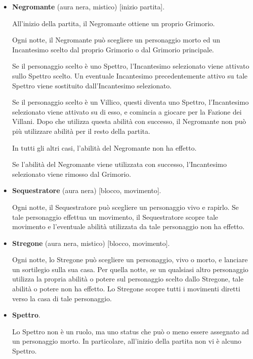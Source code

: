 \documentclass[a4paper,10pt]{article}
\begin{document}
\begin{itemize}
    \item {\bf Negromante} (aura nera, mistico) [inizio partita].

          All'inizio della partita, il Negromante ottiene un proprio Grimorio.

          Ogni notte, il Negromante può scegliere un personaggio morto ed un Incantesimo scelto dal proprio Grimorio o dal Grimorio principale.

          Se il personaggio scelto è uno Spettro, l'Incantesimo selezionato viene attivato sullo Spettro scelto. Un eventuale Incantesimo precedentemente attivo su tale Spettro viene sostituito dall'Incantesimo selezionato. %

          Se il personaggio scelto è un Villico, questi diventa uno Spettro, l'Incantesimo selezionato viene attivato su di esso, e comincia a giocare per la Fazione dei Villani. Dopo che utilizza questa abilità con successo, il Negromante non può più utilizzare abilità per il resto della partita.

          In tutti gli altri casi, l'abilità del Negromante non ha effetto.

          Se l'abilità del Negromante viene utilizzata con successo, l'Incantesimo selezionato viene rimosso dal Grimorio.

    \item {\bf Sequestratore} (aura nera) [blocco, movimento].

          Ogni notte, il Sequestratore può scegliere un personaggio vivo e rapirlo. Se tale personaggio effettua un movimento, il Sequestratore scopre tale movimento e l'eventuale abilità utilizzata da tale personaggio non ha effetto.

    \item {\bf Stregone} (aura nera, mistico) [blocco, movimento].

          Ogni notte, lo Stregone può scegliere un personaggio, vivo o morto, e lanciare un sortilegio sulla sua casa. Per quella notte, se un qualsiasi altro personaggio utilizza la propria abilità o potere sul personaggio scelto dallo Stregone, tale abilità o potere non ha effetto. Lo Stregone scopre tutti i movimenti diretti verso la casa di tale personaggio.

    \item {\bf Spettro}.

          Lo Spettro non è un ruolo, ma uno status che può o meno essere assegnato ad un personaggio morto. In particolare, all'inizio della partita non vi è alcuno Spettro.


\end{itemize}
\end{document}
